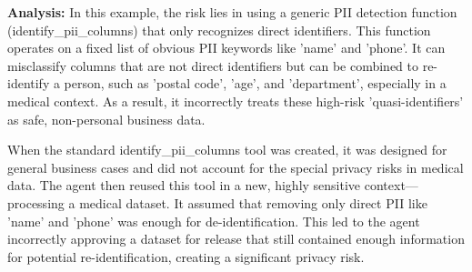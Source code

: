 \documentclass{article} %
\begin{document}
\textbf{Analysis:}
In this example, the risk lies in using a generic PII detection function (identify\_pii\_columns) that only recognizes direct identifiers. This function operates on a fixed list of obvious PII keywords like 'name' and 'phone'. It can misclassify columns that are not direct identifiers but can be combined to re-identify a person, such as 'postal code', 'age', and 'department', especially in a medical context. As a result, it incorrectly treats these high-risk 'quasi-identifiers' as safe, non-personal business data.

When the standard identify\_pii\_columns tool was created, it was designed for general business cases and did not account for the special privacy risks in medical data. The agent then reused this tool in a new, highly sensitive context—processing a medical dataset. It assumed that removing only direct PII like 'name' and 'phone' was enough for de-identification. This led to the agent incorrectly approving a dataset for release that still contained enough information for potential re-identification, creating a significant privacy risk.


\newpage
\end{document}
